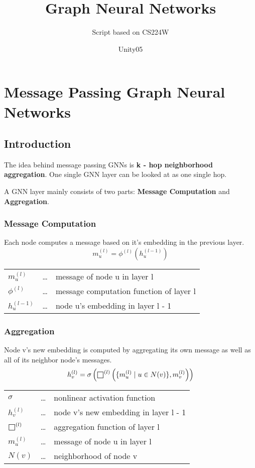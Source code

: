 \documentclass[parskip=full]{scrartcl}
\title{Graph Neural Networks}
\subtitle{Script based on CS224W}
\author{Unity05}
\def\msquare{\mathord{\scalerel*{\Box}{gX}}}
\begin{document}
\begin{titlepage}
\maketitle
\end{titlepage}

\section{Message Passing Graph Neural Networks}

\subsection{Introduction}
The idea behind message passing GNNs is \textbf{k - hop neighborhood aggregation}.
One single GNN layer can be looked at as one single hop.

A GNN layer mainly consists of two parts: \textbf{Message Computation} and \textbf{Aggregation}.

\subsubsection{Message Computation}
Each node computes a message based on it's embedding in the previous layer.
\[m_u^{(l)} = \phi^{(l)}\left(h_u^{(l-1)}\right)\]
\begin{center}
\begin{tabular}{l c l}
	$m_u^{(l)}$ & \dots & message of node u in layer l \\
	$\phi^{(l)}$ & \dots & message computation function of layer l \\
	$h_u^{(l - 1)}$ & \dots & node u's embedding in layer l - 1
\end{tabular}
\end{center}

\subsubsection{Aggregation}
Node v's new embedding is computed by aggregating its own message as well as all of its neighbor node's messages.
\[h_v^{(l)} = \sigma\left(\msquare^{(l)}\left(\{m_u^{(l)} \mid u \in N(v)\}, m_v^{(l)}\right)\right)\]
\begin{center}
\begin{tabular}{l c l}
	$\sigma$ & \dots & nonlinear activation function \\
	$h_v^{(l)}$ & \dots & node v's new embedding in layer l - 1 \\
	$\msquare^{(l)}$ & \dots & aggregation function of layer l \\
	$m_u^{(l)}$ & \dots & message of node u in layer l \\
	$N(v)$ & \dots & neighborhood of node v
\end{tabular}
\end{center}
\end{document}
